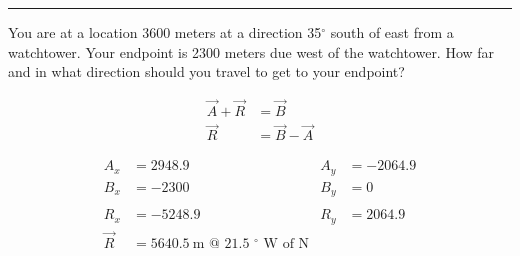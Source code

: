 \documentclass[12pt]{exam}
\begin{document}
\begin{questions}

    \vs \hrule \vs

  \question
    You are at a location 3600 meters at a direction 35$^\circ$ south of east from a watchtower.  Your endpoint is 2300 meters due west of the watchtower.  How far and in what direction should you travel to get to your endpoint?
    \begin{solution}


      \begin{align*}
        \vec{A} + \vec{R} &= \vec{B} \\
        \vec{R}           &= \vec{B} - \vec{A}
      \end{align*}

      \begin{align*}
        A_x &= 2948.9 &
        A_y &= -2064.9\\
        B_x &= -2300 &
        B_y &= 0 \\\\
        R_x &= -5248.9 &
        R_y &= 2064.9 \\
        \vec{R} &= 5640.5~\text{m @ 21.5 $^\circ$ W of N}
      \end{align*}
    \end{solution}


\end{questions}
\end{document}
